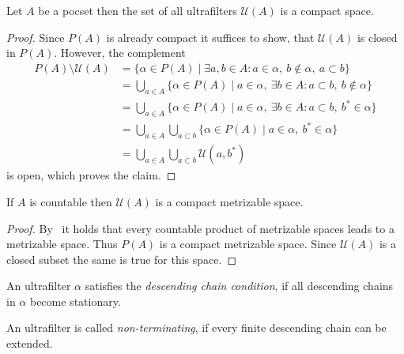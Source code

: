 \begin{prop}
  Let \(A\) be a pocset then the set of all ultrafilters \(\mathcal{U}(A)\) is a compact space.
\end{prop}

\begin{proof}
  Since \(P(A)\) is already compact it suffices to show, that \(\mathcal{U}(A)\) is closed in \(P(A)\). However, the complement
  \begin{align*}
    P(A) \setminus \mathcal{U}(A)
    & = \{\alpha \in P(A) \mid \exists a, b \in A\colon a \in \alpha,\ b \notin \alpha,\ a \subset b\}\\
    & = \bigcup_{a \in A} \{\alpha \in P(A) \mid a \in \alpha,\ \exists b \in A\colon a \subset b,\ b \notin \alpha\}\\
    & = \bigcup_{a \in A} \{\alpha \in P(A) \mid a \in \alpha,\ \exists b \in A\colon a \subset b,\ b^\ast \in \alpha\}\\
    & = \bigcup_{a \in A} \bigcup_{a \subset b}\{\alpha \in P(A) \mid a \in \alpha,\ b^\ast \in \alpha\}\\
    & = \bigcup_{a \in A} \bigcup_{a \subset b}\mathcal{U}(a, b^\ast)
  \end{align*}
  is open, which proves the claim.
\end{proof}

\begin{cor}
  \label{cor:comp-met}
  If \(A\) is countable then \(\mathcal{U}(A)\) is a compact metrizable space.
\end{cor}

\begin{proof}
  By~\textcite[Thm.\ 4.2.2]{Engelking} it holds that every countable product of metrizable spaces leads to a metrizable space. Thus \(P(A)\) is a compact metrizable space. Since \(\mathcal{U}(A)\) is a closed subset the same is true for this space.
\end{proof}

\begin{defin}
  An ultrafilter \(\alpha\) satisfies the \emph{descending chain condition}, if all descending chains in \(\alpha\) become stationary.

  An ultrafilter is called \emph{non-terminating}, if every finite descending chain can be extended.
\end{defin}

